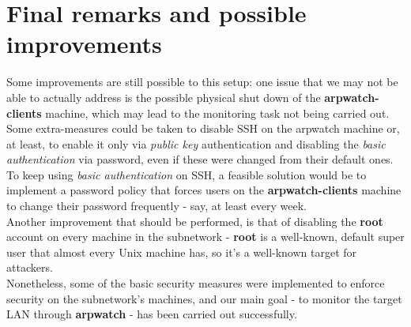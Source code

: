 \section{Final remarks and possible improvements}
Some improvements are still possible to this setup: one issue that we may not be able to actually address is the possible physical shut down of the \textbf{arpwatch-clients} machine, which may lead to the monitoring task not being carried out.\\
Some extra-measures could be taken to disable SSH on the arpwatch machine or, at least, to enable it only via \textit{public key} authentication and disabling the \textit{basic authentication} via password, even if these were changed from their default ones. To keep using \textit{basic authentication} on SSH, a feasible solution would be to implement a password policy that forces users on the \textbf{arpwatch-clients} machine to change their password frequently - say, at least every week.\\
Another improvement that should be performed, is that of disabling the \textbf{root} account on every machine in the subnetwork - \textbf{root} is a well-known, default super user that almost every Unix machine has, so it's a well-known target for attackers.\\
Nonetheless, some of the basic security measures were implemented to enforce security on the subnetwork's machines, and our main goal - to monitor the target LAN through \textbf{arpwatch} - has been carried out successfully.
